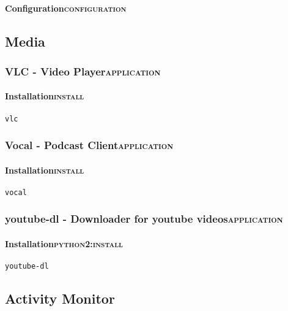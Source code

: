 \documentclass[11pt]{article}
\begin{document}
\paragraph{Configuration\hfill{}\textsc{configuration}}
\label{sec:org99b21c6}
\subsection{Media}
\label{sec:org28a315a}
\subsubsection{VLC - Video Player\hfill{}\textsc{application}}
\label{sec:org46829d3}
\paragraph{Installation\hfill{}\textsc{install}}
\label{sec:orgfdd3148}
\begin{verbatim}
vlc
\end{verbatim}

\subsubsection{Vocal - Podcast Client\hfill{}\textsc{application}}
\label{sec:orgf735f48}
\paragraph{Installation\hfill{}\textsc{install}}
\label{sec:orged55109}
\begin{verbatim}
vocal
\end{verbatim}

\subsubsection{youtube-dl - Downloader for youtube videos\hfill{}\textsc{application}}
\label{sec:org849cad9}
\paragraph{Installation\hfill{}\textsc{python2:install}}
\label{sec:orgffc2337}
\begin{verbatim}
youtube-dl
\end{verbatim}

\subsection{Activity Monitor}
\label{sec:orgc948593}
\end{document}
